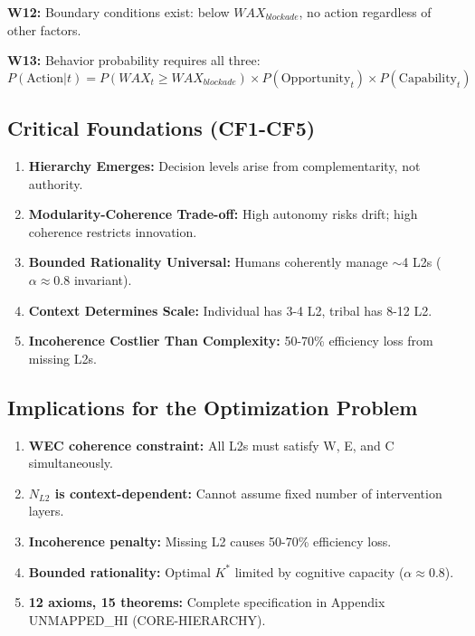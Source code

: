 \textbf{W12:} Boundary conditions exist: below $WAX_{blockade}$, no action regardless of other factors.

\textbf{W13:} Behavior probability requires all three:
\begin{equation}
P(\text{Action}|t) = P(WAX_t \geq WAX_{blockade}) \times P(\text{Opportunity}_t) \times P(\text{Capability}_t)
\label{eq:mp-action-probability}
\end{equation}

\subsection{Critical Foundations (CF1-CF5)}

\begin{enumerate}[nosep]
\item \textbf{Hierarchy Emerges:} Decision levels arise from complementarity, not authority.
\item \textbf{Modularity-Coherence Trade-off:} High autonomy risks drift; high coherence restricts innovation.
\item \textbf{Bounded Rationality Universal:} Humans coherently manage $\sim$4 L2s ($\alpha \approx 0.8$ invariant).
\item \textbf{Context Determines Scale:} Individual has 3-4 L2, tribal has 8-12 L2.
\item \textbf{Incoherence Costlier Than Complexity:} 50-70\% efficiency loss from missing L2s.
\end{enumerate}

\subsection{Implications for the Optimization Problem}

\begin{enumerate}[nosep]
\item \textbf{WEC coherence constraint:} All L2s must satisfy W, E, and C simultaneously.
\item \textbf{$N_{L2}$ is context-dependent:} Cannot assume fixed number of intervention layers.
\item \textbf{Incoherence penalty:} Missing L2 causes 50-70\% efficiency loss.
\item \textbf{Bounded rationality:} Optimal $K^*$ limited by cognitive capacity ($\alpha \approx 0.8$).
\item \textbf{12 axioms, 15 theorems:} Complete specification in Appendix UNMAPPED_HI (CORE-HIERARCHY).
\end{enumerate}

